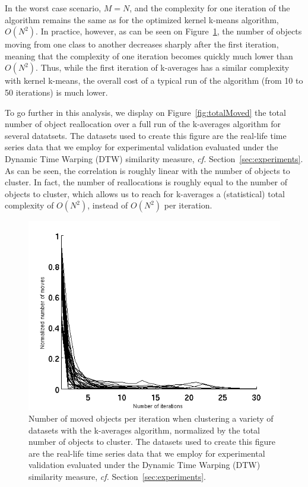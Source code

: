 \documentclass[natbib,smallextended]{svjour3}
\begin{document}
In the worst case scenario, $M = N$, and the complexity for one iteration of the algorithm remains the same as for the optimized kernel k-means algorithm, $O(N^2)$. In practice, however, as can be seen on Figure~\ref{fig:moved}, the number of objects moving from one class to another decreases sharply after the first iteration, meaning that the complexity of one iteration becomes quickly much lower than $O(N^2)$. Thus, while the first iteration of k-averages has a similar complexity with kernel k-means, the overall cost of a typical run of the algorithm (from 10 to 50 iterations) is much lower.


To go further in this analysis, we display on Figure~\ref{fig:totalMoved}  the total number of object reallocation over a full run of the k-averages algorithm for several datatsets. The datasets used to create this figure are the real-life time series data that we employ for experimental validation evaluated under the Dynamic Time Warping (DTW) similarity measure, \textit{cf.} Section~\ref{sec:experiments}. As can be seen, the correlation is roughly linear with the number of objects to cluster. In fact, the number of reallocations is roughly equal to the number of objects to cluster, which allows us to reach for k-averages a (statistical) total complexity of $O(N^2)$, instead of $O(N^2)$ per iteration.

\begin{figure}
\center
\includegraphics[width = .65\textwidth]{figures/iterMove.png}
\caption{Number of moved objects per iteration when clustering a variety of datasets with the k-averages algorithm, normalized by the total number of objects to cluster. The datasets used to create this figure are the real-life time series data that we employ for experimental validation evaluated under the Dynamic Time Warping (DTW) similarity measure, \textit{cf.} Section~\ref{sec:experiments}.}
\label{fig:moved}
\end{figure}
\end{document}
